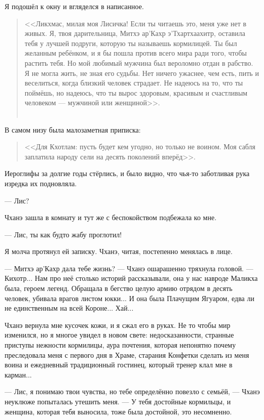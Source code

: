 Я подошёл к окну и вгляделся в написанное.

\begin{quote}
<<Ликхмас, милая моя Лисичка!
Если ты читаешь это, меня уже нет в живых.
Я, твоя дарительница, Митхэ ар’Кахр э’Тхартхаахитр, оставила тебя у лучшей подруги, которую ты называешь кормилицей.
Ты был желанным ребёнком, и я бы пошла против всего мира ради того, чтобы растить тебя.
Но мой любимый мужчина был вероломно отдан в рабство.
Я не могла жить, не зная его судьбы.
Нет ничего ужаснее, чем есть, пить и веселиться, когда близкий человек страдает.
Не надеюсь на то, что ты поймёшь, но надеюсь, что ты вырос здоровым, красивым и счастливым человеком --- мужчиной или женщиной>>.\\~\\
\end{quote}

В самом низу была малозаметная приписка:

\begin{quote}
<<Для Кхотлам: пусть будет кем угодно, но только не воином.
Моя сабля заплатила народу сели на десять поколений вперёд>>.
\end{quote}

Иероглифы за долгие годы стёрлись, и было видно, что чья-то заботливая рука изредка их подновляла.

--- Лис?

Чханэ зашла в комнату и тут же с беспокойством подбежала ко мне.

--- Лис, ты как будто жабу проглотил!

Я молча протянул ей записку.
Чханэ, читая, постепенно менялась в лице.

--- Митхэ ар’Кахр дала тебе жизнь? --- Чханэ ошарашенно тряхнула головой.
--- Кихотр...
Нам про неё столько историй рассказывали, она у нас навроде Маликха была, героем легенд.
Обращала в бегство целую армию отрядом в десять человек, убивала врагов листом юкки...
И она была Плачущим Ягуаром, едва ли не единственным на всей Короне...
Хай...

Чханэ вернула мне кусочек кожи, и я сжал его в руках.
Не то чтобы мир изменился, но я многое увидел в новом свете: недосказанности, странные приступы нежности кормилицы, аура почтения, которая непонятно почему преследовала меня с первого дня в Храме, старания Конфетки сделать из меня воина и ежедневный традиционный гостинец, который тренер клал мне в карман...

--- Лис, я понимаю твои чувства, но тебе определённо повезло с семьёй, --- Чханэ неуклюже попыталась утешить меня.
--- У тебя достойные кормильцы, и женщина, которая тебя выносила, тоже была достойной, это несомненно.

